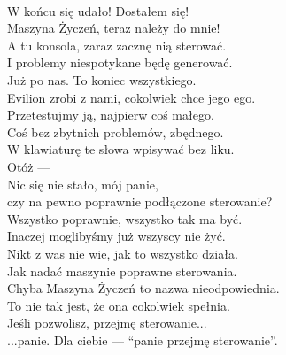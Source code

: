 \\

\chardok{}
W końcu się udało! Dostałem się!\\
Maszyna Życzeń, teraz należy do mnie!\\
A tu konsola, zaraz zacznę nią sterować.\\
I problemy niespotykane będę generować.\\

\charmik{}
Już po nas. To koniec wszystkiego.\\
Evilion zrobi z nami, cokolwiek chce jego ego.\\

\chardok{}
Przetestujmy ją, najpierw coś małego.\\
Coś bez zbytnich problemów, zbędnego.\\
W klawiaturę te słowa wpisywać bez liku.\\
Otóż --- \\

\charprzy{}
Nic się nie stało, mój panie,\\
czy na pewno poprawnie podłączone sterowanie?\\

\charmik{}
Wszystko poprawnie, wszystko tak ma być.\\
Inaczej moglibyśmy już wszyscy nie żyć.\\
Nikt z was nie wie, jak to wszystko działa.\\
Jak nadać maszynie poprawne sterowania.\\

\charprzy{}
Chyba Maszyna Życzeń to nazwa nieodpowiednia.\\
To nie tak jest, że ona cokolwiek spełnia.\\
Jeśli pozwolisz, przejmę sterowanie...\\

\chardok{}
...panie.
Dla ciebie --- "`panie przejmę sterowanie"'.\\

\\

